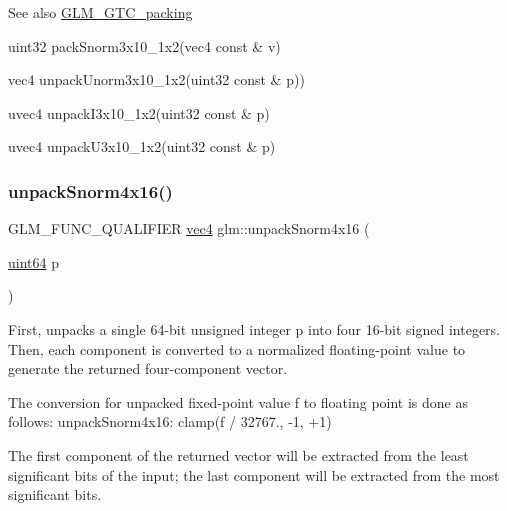 \begin{DoxySeeAlso}{See also}
\hyperlink{group__gtc__packing}{G\+L\+M\+\_\+\+G\+T\+C\+\_\+packing} 

uint32 pack\+Snorm3x10\+\_\+1x2(vec4 const \& v) 

vec4 unpack\+Unorm3x10\+\_\+1x2(uint32 const \& p)) 

uvec4 unpack\+I3x10\+\_\+1x2(uint32 const \& p) 

uvec4 unpack\+U3x10\+\_\+1x2(uint32 const \& p) 
\end{DoxySeeAlso}
\mbox{\label{group__gtc__packing_ga1bfaa3f217fd7a4b6b9d3117ecb3fcac}} 
\subsubsection{\texorpdfstring{unpack\+Snorm4x16()}{unpackSnorm4x16()}}
{\footnotesize\ttfamily G\+L\+M\+\_\+\+F\+U\+N\+C\+\_\+\+Q\+U\+A\+L\+I\+F\+I\+ER \hyperlink{group__core__types_ga5881b1b022d7fd1b7218f5916532dd02}{vec4} glm\+::unpack\+Snorm4x16 (\begin{DoxyParamCaption}\item[{\hyperlink{group__gtc__type__precision_gae3632bf9b37da66233d78930dd06378a}{uint64}}]{p }\end{DoxyParamCaption})}

First, unpacks a single 64-\/bit unsigned integer p into four 16-\/bit signed integers. Then, each component is converted to a normalized floating-\/point value to generate the returned four-\/component vector.

The conversion for unpacked fixed-\/point value f to floating point is done as follows\+: unpack\+Snorm4x16\+: clamp(f / 32767., -\/1, +1)

The first component of the returned vector will be extracted from the least significant bits of the input; the last component will be extracted from the most significant bits.

